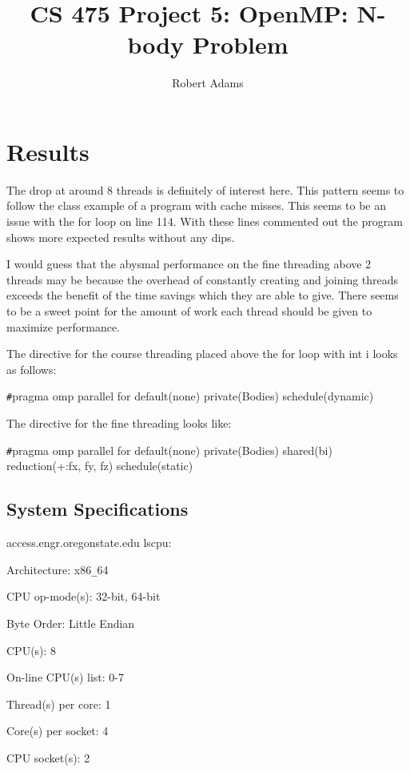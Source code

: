 \documentclass[letterpaper,10pt]{article} %
\begin{document}
\title{CS 475 Project 5: OpenMP: N-body Problem}
\author{Robert Adams}
\maketitle



\section{Results}

The drop at around 8 threads is definitely of interest here.
This pattern seems to follow the class example of a program with cache misses.
 This seems to be an issue with the for loop on line 114. With these
 lines commented out the program shows more expected results without any dips. 


I would guess that the abysmal performance on the fine threading
above 2 threads may be because the overhead of constantly creating 
and joining threads exceeds the benefit of the time savings which they 
are able to give. There seems to be a sweet point for the amount of
work each thread should be given to maximize performance. 


The directive for the course threading placed above the for loop with int i looks as follows:

\verb|#|pragma omp parallel for default(none) private(Bodies) schedule(dynamic) 

The directive for the fine threading looks like:

\verb|#|pragma omp parallel for default(none) private(Bodies) shared(bi) reduction(+:fx, fy, fz) schedule(static)


\subsection{System Specifications}

access.engr.oregonstate.edu   lscpu:

Architecture:          x86\verb|_|64

CPU op-mode(s):        32-bit, 64-bit

Byte Order:            Little Endian

CPU(s):                8

On-line CPU(s) list:   0-7

Thread(s) per core:    1

Core(s) per socket:    4

CPU socket(s):         2
\end{document}
